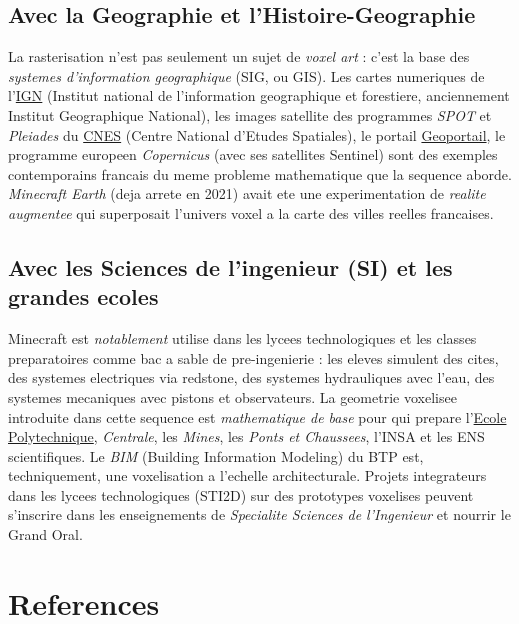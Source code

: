 \documentclass[12pt,a4paper]{scrartcl}
\begin{document}
\subsection{Avec la Geographie et l'Histoire-Geographie}
La rasterisation n'est pas seulement un sujet de \emph{voxel art} : c'est la base des \emph{systemes d'information geographique} (SIG, ou GIS). Les cartes numeriques de l'\href{https://www.ign.fr/}{IGN} (Institut national de l'information geographique et forestiere, anciennement Institut Geographique National), les images satellite des programmes \emph{SPOT} et \emph{Pleiades} du \href{https://cnes.fr/}{CNES} (Centre National d'Etudes Spatiales), le portail \href{https://www.geoportail.gouv.fr/}{Geoportail}, le programme europeen \emph{Copernicus} (avec ses satellites Sentinel) sont des exemples contemporains francais du meme probleme mathematique que la sequence aborde. \emph{Minecraft Earth} (deja arrete en 2021) avait ete une experimentation de \emph{realite augmentee} qui superposait l'univers voxel a la carte des villes reelles francaises.

\subsection{Avec les Sciences de l'ingenieur (SI) et les grandes ecoles}
Minecraft est \emph{notablement} utilise dans les lycees technologiques et les classes preparatoires comme bac a sable de pre-ingenierie : les eleves simulent des cites, des systemes electriques via redstone, des systemes hydrauliques avec l'eau, des systemes mecaniques avec pistons et observateurs. La geometrie voxelisee introduite dans cette sequence est \emph{mathematique de base} pour qui prepare l'\href{https://www.polytechnique.edu/}{Ecole Polytechnique}, \emph{Centrale}, les \emph{Mines}, les \emph{Ponts et Chaussees}, l'INSA et les ENS scientifiques. Le \emph{BIM} (Building Information Modeling) du BTP est, techniquement, une voxelisation a l'echelle architecturale. Projets integrateurs dans les lycees technologiques (STI2D) sur des prototypes voxelises peuvent s'inscrire dans les enseignements de \emph{Specialite Sciences de l'Ingenieur} et nourrir le Grand Oral.

\section{References}\label{sec:referencias}
\end{document}
